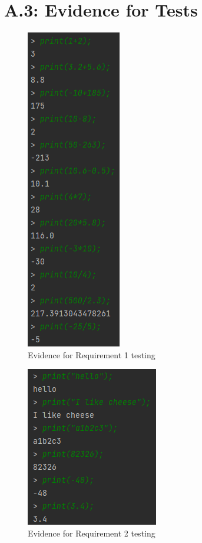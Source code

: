 \documentclass[a4paper, oneside, 11pt]{report}
\begin{document}
\section*{A.3: Evidence for Tests}
\label{evidence}
\newpage
\begin{figure}
\includegraphics{Requirement 1.PNG}
\caption{Evidence for Requirement 1 testing}
\end{figure}

\begin{figure}
\includegraphics{Requirement 2.PNG}
\caption{Evidence for Requirement 2 testing}
\end{figure}
\end{document}
